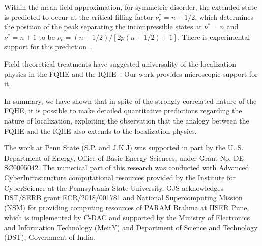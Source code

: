 \documentclass[twocolumn,floatfix,prb,aps,showpacs]{revtex4-2}
\begin{document}
Within the mean field approximation, for symmetric disorder, the extended state is predicted to occur at the critical filling factor $\nu_c^*=n+1/2$, which determines the position of the peak separating the incompressible states at $\nu^*=n$ and $\nu^*=n+1$ to be $\nu_c=(n+1/2)/[2p(n+1/2)\pm 1]$. There is experimental support for this prediction~\cite{Goldman90b}.


Field theoretical treatments have suggested universality of the localization physics in the FQHE and the IQHE~\cite{Laughlin85,Kivelson92b,Burgess01,Huckestein96}. Our work provides microscopic support for it.  


In summary, we have shown that in spite of the strongly correlated nature of the FQHE, it is possible to make detailed quantitative predictions regarding the nature of localization, exploiting the observation that 
the analogy between the FQHE and the IQHE also extends to the localization physics.


The work at Penn State (S.P. and J.K.J) was supported in part by the U. S. Department of Energy, Office of Basic Energy Sciences, under Grant No. DE-SC0005042. The numerical part of this research was conducted with Advanced CyberInfrastructure computational resources provided by the Institute for CyberScience at the Pennsylvania State University. GJS acknowledges DST/SERB grant ECR/2018/001781 and National Supercomputing Mission (NSM) for providing computing resources of PARAM Brahma at IISER Pune, which is implemented by C-DAC and supported by the Ministry of Electronics and Information Technology (MeitY) and Department of Science and Technology (DST), Government of India.  
\end{document}
